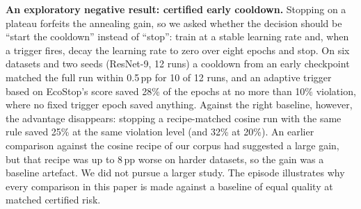 \documentclass[3p,twocolumn,10pt]{elsarticle}
\theoremstyle{definition}
\begin{document}
\textbf{An exploratory negative result: certified early cooldown.} Stopping on a plateau forfeits the annealing gain, so we asked whether the decision should be ``start the cooldown'' instead of ``stop'': train at a stable learning rate and, when a trigger fires, decay the learning rate to zero over eight epochs and stop. On six datasets and two seeds (ResNet-9, 12 runs) a cooldown from an early checkpoint matched the full run within 0.5\,pp for 10 of 12 runs, and an adaptive trigger based on EcoStop's score saved 28\% of the epochs at no more than 10\% violation, where no fixed trigger epoch saved anything. Against the right baseline, however, the advantage disappears: stopping a recipe-matched cosine run with the same rule saved 25\% at the same violation level (and 32\% at 20\%). An earlier comparison against the cosine recipe of our corpus had suggested a large gain, but that recipe was up to 8\,pp worse on harder datasets, so the gain was a baseline artefact. We did not pursue a larger study. The episode illustrates why every comparison in this paper is made against a baseline of equal quality at matched certified risk.
\end{document}
